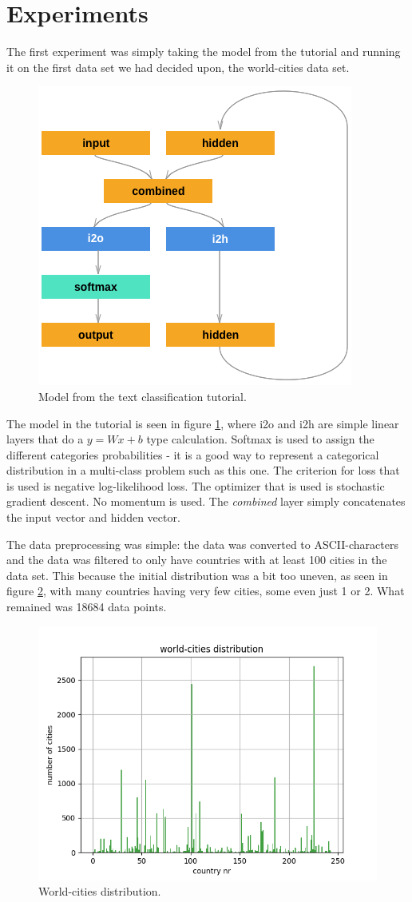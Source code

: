 \documentclass[runningheads]{llncs}
\begin{document}
\section{Experiments}

The first experiment was simply taking the model from the tutorial and running it on the first data set we had decided upon, the world-cities data set. 


\begin{figure}[h!]
	\centering
    \includegraphics[width=.5\textwidth]{../plots/tutorial_model.png}
	\caption{ Model from the text classification tutorial.}
	\label{fig:model_tutorial}
\end{figure}

The model in the tutorial is seen in figure \ref{fig:model_tutorial}, where i2o and i2h are simple linear layers that do a $y=Wx + b$ type calculation. Softmax is used to assign the different categories probabilities - it is a good way to represent a categorical distribution in a multi-class problem such as this one.
The criterion for loss that is used is negative log-likelihood loss.
The optimizer that is used is stochastic gradient descent. No momentum is used.
The \textit{combined} layer simply concatenates the input vector and hidden vector.

The data preprocessing was simple: the data was converted to ASCII-characters and the data was filtered to only have countries with at least 100 cities in the data set. This because the initial distribution was a bit too uneven, as seen in figure \ref{fig:world_cities}, with many countries having very few cities, some even just 1 or 2. What remained was 18684 data points.

\begin{figure}[h!]
	\centering
	\includegraphics[width=.5\textwidth]{../plots/dist.png}	
	\caption{ World-cities distribution.}
	\label{fig:world_cities}
\end{figure}
\end{document}
